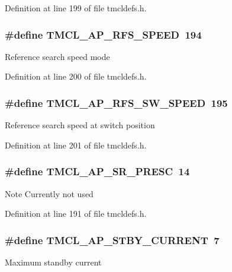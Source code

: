 Definition at line 199 of file tmcldefs.h.\hypertarget{group__RWParam_ga4c6ebda674b3ce393db587761c169515}{
\subsubsection[{TMCL\_\-AP\_\-RFS\_\-SPEED}]{\setlength{\rightskip}{0pt plus 5cm}\#define TMCL\_\-AP\_\-RFS\_\-SPEED~194}}
\label{group__RWParam_ga4c6ebda674b3ce393db587761c169515}
Reference search speed mode 

Definition at line 200 of file tmcldefs.h.\hypertarget{group__RWParam_ga31404aaf7195272cd4a6ef150d6ea421}{
\subsubsection[{TMCL\_\-AP\_\-RFS\_\-SW\_\-SPEED}]{\setlength{\rightskip}{0pt plus 5cm}\#define TMCL\_\-AP\_\-RFS\_\-SW\_\-SPEED~195}}
\label{group__RWParam_ga31404aaf7195272cd4a6ef150d6ea421}
Reference search speed at switch position 

Definition at line 201 of file tmcldefs.h.\hypertarget{group__RWParam_gab96353fcd1f433ef38ea445f812d2616}{
\subsubsection[{TMCL\_\-AP\_\-SR\_\-PRESC}]{\setlength{\rightskip}{0pt plus 5cm}\#define TMCL\_\-AP\_\-SR\_\-PRESC~14}}
\label{group__RWParam_gab96353fcd1f433ef38ea445f812d2616}
\begin{DoxyNote}{Note}
Currently not used 
\end{DoxyNote}


Definition at line 191 of file tmcldefs.h.\hypertarget{group__RWParam_ga7e4a74f86decbbced917fb7825aef450}{
\subsubsection[{TMCL\_\-AP\_\-STBY\_\-CURRENT}]{\setlength{\rightskip}{0pt plus 5cm}\#define TMCL\_\-AP\_\-STBY\_\-CURRENT~7}}
\label{group__RWParam_ga7e4a74f86decbbced917fb7825aef450}
Maximum standby current 

